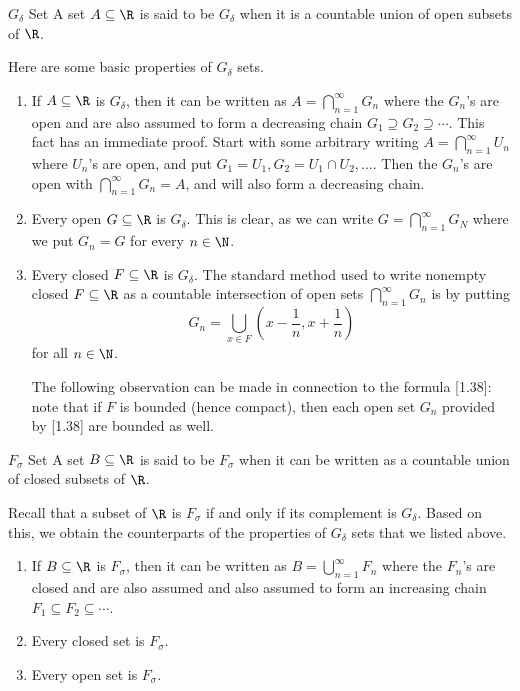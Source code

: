 \documentclass[pmath450]{subfiles}
\begin{document}
    \begin{definition}{$G_{\delta}$ Set}
        A set $A\subseteq\R$ is said to be $G_{\delta}$ when it is a countable union of open subsets of $\R$.
    \end{definition}

    \np Here are some basic properties of $G_{\delta}$ sets.
    \begin{enumerate}
        \item If $A\subseteq\R$ is $G_{\delta}$, then it can be written as $A=\bigcap^{\infty}_{n=1}G_n$ where the $G_n$'s are open and are also assumed to form a decreasing chain $G_1\supseteq G_2\supseteq\cdots$. This fact has an immediate proof. Start with some arbitrary writing $A=\bigcap^{\infty}_{n=1}U_n$ where $U_n$'s are open, and put $G_1=U_1, G_2=U_1\cap U_2,\ldots$. Then the $G_n$'s are open with $\bigcap^{\infty}_{n=1}G_n=A$, and will also form a decreasing chain.

        \item Every open $G\subseteq\R$ is $G_{\delta}$. This is clear, as we can write $G=\bigcap^{\infty}_{n=1}G_N$ where we put $G_n=G$ for every $n\in\N$.

        \item Every closed $F\subseteq\R$ is $G_{\delta}$. The standard method used to write nonempty closed $F\subseteq\R$ as a countable intersection of open sets $\bigcap^{\infty}_{n=1}G_n$ is by putting
            \begin{equation}
                G_n=\bigcup^{}_{x\in F}\left( x-\frac{1}{n},x+\frac{1}{n} \right)
            \end{equation}
            for all $n\in\N$.

            The following observation can be made in connection to the formula [1.38]: note that if $F$ is bounded (hence compact), then each open set $G_n$ provided by [1.38] are bounded as well.
    \end{enumerate}
    
    \begin{definition}{$F_{\sigma}$ Set}
        A set $B\subseteq\R$ is said to be $F_{\sigma}$ when it can be written as a countable union of closed subsets of $\R$.
    \end{definition}

    \np Recall that a subset of $\R$ is $F_{\sigma}$ if and only if its complement is $G_{\delta}$. Based on this, we obtain the counterparts of the properties of $G_{\delta}$ sets that we listed above.
    \begin{enumerate}
        \item If $B\subseteq\R$ is $F_{\sigma}$, then it can be written as $B=\bigcup^{\infty}_{n=1}F_n$ where the $F_n$'s are closed and are also assumed and also assumed to form an increasing chain $F_1\subseteq F_2\subseteq\cdots$.
        \item Every closed set is $F_{\sigma}$.
        \item Every open set is $F_{\sigma}$.
    \end{enumerate}
\end{document}
